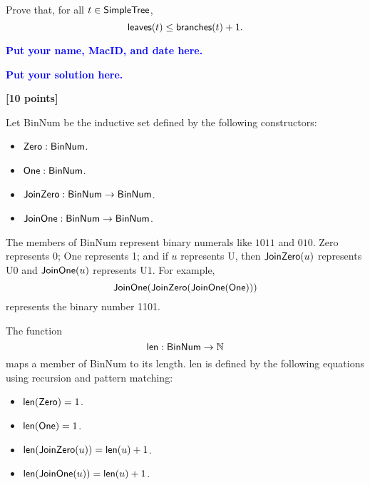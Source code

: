 \documentclass[11pt,fleqn]{article}
\newcommand{\bi}{\begin{itemize}}
\newcommand{\ei}{\end{itemize}}
\newcommand{\mname}[1]{\mbox{\sf #1}}
\begin{document}
  Prove that, for all $t \in \mname{SimpleTree}$, \[\mname{leaves}(t) \le
  \mname{branches}(t) + 1.\]

  \textcolor{blue}{\textbf{Put your name, MacID, and date here.}}

  \textcolor{blue}{\textbf{Put your solution here.}}

  \bigskip

  \item \textbf{[10 points]} 

  Let \mname{BinNum} be the inductive set defined by the following
  constructors:

  \bi

    \item[] $\mname{Zero} : \mname{BinNum}$.

    \item[] $\mname{One} : \mname{BinNum}$.

    \item[] $\mname{JoinZero} : \mname{BinNum} \rightarrow \mname{BinNum}$.

    \item[] $\mname{JoinOne} : \mname{BinNum} \rightarrow \mname{BinNum}$.

  \ei

  The members of \mname{BinNum} represent binary numerals like $1011$
  and $010$. \mname{Zero} represents 0; \mname{One} represents 1; and
  if $u$ represents U, then $\mname{JoinZero}(u)$ represents U$0$
  and $\mname{JoinOne}(u)$ represents U$1$.  For
  example, \[\mname{JoinOne}(\mname{JoinZero}(\mname{JoinOne}(\mname{One})))\]
  represents the binary number 1101.

  The function \[\mname{len} : \mname{BinNum} \rightarrow \mathbb{N}\]
  maps a member of \mname{BinNum} to its length.  \mname{len} is
  defined by the following equations using recursion and pattern
  matching:

  \bi

    \item[] $\mname{len}(\mname{Zero}) = 1$.

    \item[] $\mname{len}(\mname{One}) = 1$.

    \item[] $\mname{len}(\mname{JoinZero}(u)) = \mname{len}(u) + 1$.

    \item[] $\mname{len}(\mname{JoinOne}(u)) = \mname{len}(u) + 1$.

  \ei
\end{document}
